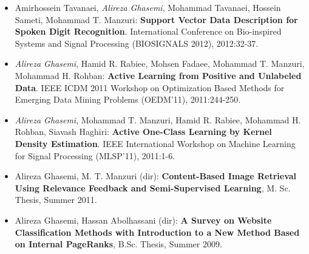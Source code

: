 \documentclass[11pt,a4paper,sans]{moderncv}        %
\begin{document}
{\begin{itemize}
\item Amirhossein Tavanaei,\textit{ Alireza Ghasemi}, Mohammad Tavanaei, Hossein Sameti, Mohammad T. Manzuri: \textbf{Support Vector Data Description for Spoken Digit Recognition}. International Conference on Bio-inspired Systems and Signal Processing (BIOSIGNALS 2012), 2012:32-37.

\item \textit{Alireza Ghasemi}, Hamid R. Rabiee, Mohsen Fadaee, Mohammad T. Manzuri, Mohammad H. Rohban:\textbf{ Active Learning from Positive and Unlabeled Data}. IEEE ICDM 2011 Workshop on Optimization Based Methods for Emerging Data Mining Problems (OEDM'11), 2011:244-250.

\item \textit{Alireza Ghasemi}, Mohammad T. Manzuri, Hamid R. Rabiee, Mohammad H. Rohban, Siavash Haghiri: \textbf{Active One-Class Learning by Kernel Density Estimation}. IEEE International Workshop on Machine Learning for Signal Processing (MLSP'11), 2011:1-6.




\item Alireza Ghasemi, M. T. Manzuri (dir): \textbf{Content-Based Image Retrieval Using Relevance Feedback and Semi-Supervised Learning}, M. Sc. Thesis, Summer 2011.
\item Alireza Ghasemi, Hassan Abolhassani (dir): \textbf{A Survey on Website Classification Methods with Introduction to a  New Method Based on Internal PageRanks}, B.Sc. Thesis, Summer 2009. %
\end{itemize}
}
\end{document}
